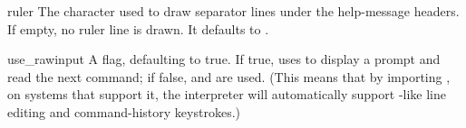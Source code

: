 \begin{memberdesc}[Cmd]{ruler}
The character used to draw separator lines under the help-message
headers.  If empty, no ruler line is drawn.  It defaults to
\character{=}.
\end{memberdesc}

\begin{memberdesc}[Cmd]{use_rawinput}
A flag, defaulting to true.  If true,  uses
 to display a prompt and read the next command;
if false,  and
 are used. (This means that by
importing , on systems that support it, the
interpreter will automatically support -like line editing 
and command-history keystrokes.)
\end{memberdesc}
